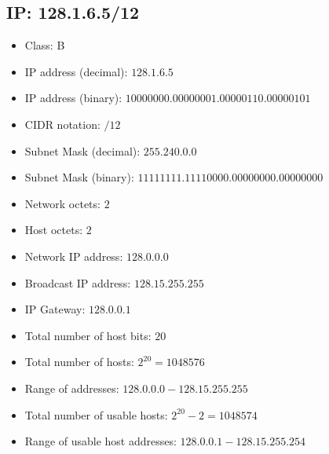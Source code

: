 \documentclass{article}
\begin{document}
\subsection*{IP: 128.1.6.5/12}
  \begin{itemize}
    \item Class: B
    \item IP address (decimal): $128.1.6.5$
    \item IP address (binary): $10000000.00000001.00000110.00000101$
    \item CIDR notation: $/12$
    \item Subnet Mask (decimal): $255.240.0.0$ 
    \item Subnet Mask (binary): $11111111.11110000.00000000.00000000$
    \item Network octets: $2$
    \item Host octets: $2$
    \item Network IP address: $128.0.0.0$
    \item Broadcast IP address: $128.15.255.255$
    \item IP Gateway: $128.0.0.1$
    \item Total number of host bits: $20$
    \item Total number of hosts: $2^{20} = 1048576$
    \item Range of addresses: $128.0.0.0 - 128.15.255.255$
    \item Total number of usable hosts: $2^{20} - 2 = 1048574$
    \item Range of usable host addresses: $128.0.0.1 - 128.15.255.254$
  \end{itemize}
\end{document}
